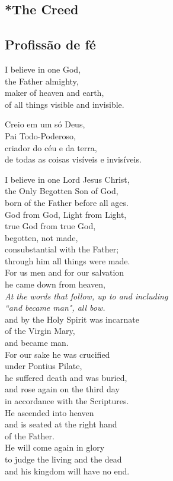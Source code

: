 \documentclass[10pt,a4]{article}
\newcommand \subsect[2] {\subsection*{#1} \switchcolumn \subsection*{#2} \switchcolumn*}
\begin{document}
\begin{paracol}{2}

 \subsect{*The Creed}{Profiss\~ao de f\'e}
I believe in one God,\\
the Father almighty,\\
maker of heaven and earth,\\
of all things visible and invisible.\\

\switchcolumn

Creio em um só Deus,\\
Pai Todo-Poderoso,\\
criador do céu e da terra,  \\
de todas as coisas visíveis e invisíveis.  \\

\switchcolumn

I believe in one Lord Jesus Christ,\\
the Only Begotten Son of God,\\
born of the Father before all ages.\\
God from God, Light from Light,\\
true God from true God,\\
begotten, not made,\\
consubstantial with the Father;\\
through him all things were made.\\
For us men and for our salvation\\
he came down from heaven,\\
{\color{red}\hspace*{4em}\small\textit{ At the words that follow, up to and including}}\\
{\color{red}\hspace*{6em}\small\textit{``and became man", all bow.}}\\
and by the Holy Spirit was incarnate\\
of the Virgin Mary,\\
and became man.\\
For our sake he was crucified\\
under Pontius Pilate,\\
he suffered death and was buried,\\
and rose again on the third day\\
in accordance with the Scriptures.\\
He ascended into heaven\\
and is seated at the right hand\\
of the Father.\\
He will come again in glory\\
to judge the living and the dead\\
and his kingdom will have no end.\\


\end{paracol}
\end{document}
